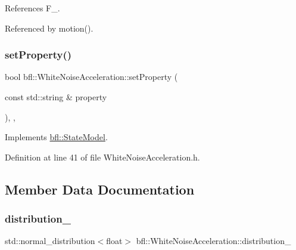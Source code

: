 References F\+\_\+.



Referenced by motion().

\mbox{\label{classbfl_1_1WhiteNoiseAcceleration_a0203b47074e0680852f53dcba8a7a627}} 
\subsubsection{\texorpdfstring{set\+Property()}{setProperty()}}
{\footnotesize\ttfamily bool bfl\+::\+White\+Noise\+Acceleration\+::set\+Property (\begin{DoxyParamCaption}\item[{const std\+::string \&}]{property }\end{DoxyParamCaption})\hspace{0.3cm}{\ttfamily [inline]}, {\ttfamily [override]}, {\ttfamily [virtual]}}



Implements \mbox{\hyperlink{classbfl_1_1StateModel_ac86dcdad8f0bbfab39a23e592779feaa}{bfl\+::\+State\+Model}}.



Definition at line 41 of file White\+Noise\+Acceleration.\+h.



\subsection{Member Data Documentation}
\mbox{\label{classbfl_1_1WhiteNoiseAcceleration_ad6d1649c319820d8f7cc9eb65666542f}} 
\subsubsection{\texorpdfstring{distribution\+\_\+}{distribution\_}}
{\footnotesize\ttfamily std\+::normal\+\_\+distribution$<$float$>$ bfl\+::\+White\+Noise\+Acceleration\+::distribution\+\_\+\hspace{0.3cm}{\ttfamily [protected]}}



